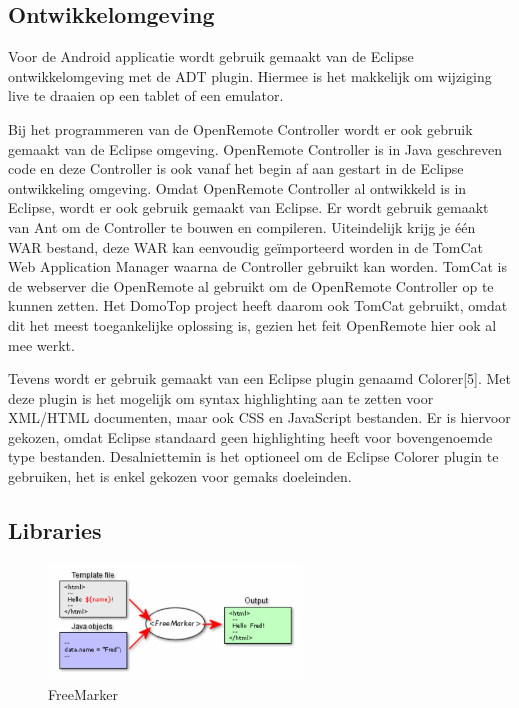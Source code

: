 \documentclass[]{article}
\begin{document}
\subsection{Ontwikkelomgeving}
Voor de Android applicatie wordt gebruik gemaakt van de Eclipse
ontwikkelomgeving met de ADT plugin. Hiermee is het makkelijk om wijziging
live te draaien op een tablet of een emulator.

Bij het programmeren van de OpenRemote Controller wordt er ook gebruik gemaakt
van de Eclipse omgeving. OpenRemote Controller is in Java geschreven code
en deze Controller is ook vanaf het begin af aan gestart in de Eclipse
ontwikkeling omgeving. Omdat OpenRemote Controller al ontwikkeld is in
Eclipse, wordt er ook gebruik gemaakt van Eclipse. Er wordt gebruik gemaakt van Ant om de Controller te bouwen en compileren. Uiteindelijk krijg
je \'e\'en WAR bestand, deze WAR kan eenvoudig ge\"importeerd worden in de TomCat
Web Application Manager waarna de Controller gebruikt kan worden. TomCat is
de webserver die OpenRemote al gebruikt om de OpenRemote Controller op te
kunnen zetten. Het DomoTop project heeft daarom ook TomCat gebruikt, omdat
dit het meest toegankelijke oplossing is, gezien het feit OpenRemote hier
ook al mee werkt.

Tevens wordt er gebruik gemaakt van een Eclipse plugin genaamd Colorer[5].
Met deze plugin is het mogelijk om syntax highlighting aan te zetten voor
XML/HTML documenten, maar ook CSS en JavaScript bestanden. Er is hiervoor
gekozen, omdat Eclipse standaard geen highlighting heeft voor bovengenoemde
type bestanden. Desalniettemin is het optioneel om de Eclipse Colorer
plugin te gebruiken, het is enkel gekozen voor gemaks doeleinden.

\subsection{Libraries}
\begin{figure}[htpb]
   \begin{center}
     \includegraphics[width=0.6\textwidth]{freemarker.pdf}
   \end{center}
   \caption{FreeMarker}
\end{figure}
\end{document}

